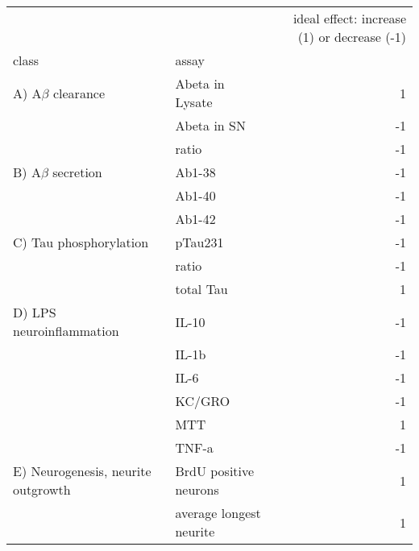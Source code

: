\documentclass[letterpaper]{article}
\begin{document}
\begin{table}[p]
\begin{tabular}{llr}
\toprule
                              &                   &  ideal effect: increase (1) or decrease (-1)\\
class & assay &                                                                      \\
\midrule
A)  A$\beta$ clearance & Abeta in Lysate &                                                  1 \\
                              & Abeta in SN &                                                 -1 \\
                              & ratio &                                                 -1 \\
B)  A$\beta$ secretion & Ab1-38 &                                                 -1 \\
                              & Ab1-40 &                                                 -1 \\
                              & Ab1-42 &                                                 -1 \\
C)  Tau phosphorylation & pTau231 &                                                 -1 \\
                              & ratio &                                                 -1 \\
                              & total Tau &                                                  1 \\
D)  LPS neuroinflammation & IL-10 &                                                 -1 \\
                              & IL-1b &                                                 -1 \\
                              & IL-6 &                                                 -1 \\
                              & KC/GRO &                                                 -1 \\
                              & MTT &                                                  1 \\
                              & TNF-a &                                                 -1 \\
E)  Neurogenesis, neurite outgrowth & BrdU positive neurons &                                                  1 \\
                              & average longest neurite &                                                  1 \\

\end{tabular}
\end{table}
\end{document}
